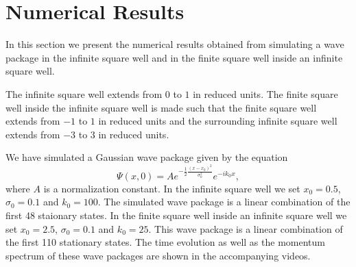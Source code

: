 \documentclass[12pt,a4paper]{article}
\begin{document}
\section{Numerical Results}
In this section we present the numerical results obtained from simulating a wave package in the infinite square well and in the finite square well inside an infinite square well.

The infinite square well extends from $0$ to $1$ in reduced units. The finite square well inside the infinite square well is made such that the finite square well extends from $-1$ to $1$ in reduced units and the surrounding infinite square well extends from $-3$ to $3$ in reduced units.

We have simulated a Gaussian wave package given by the equation
\begin{equation}
\Psi(x, 0) = A e^{- \frac{1}{2} \frac{(x - x_0)^2}{\sigma_0^2}} e^{- i k_0 x},
\end{equation}
where $A$ is a normalization constant. In the infinite square well we set $x_0 = 0.5$, $\sigma_0 = 0.1$ and $k_0 = 100$. The simulated wave package is a linear combination of the first 48 staionary states. In the finite square well inside an infinite square well we set $x_0 = 2.5$, $\sigma_0 = 0.1$ and $k_0 = 25$. This wave package is a linear combination of the first 110 stationary states. The time evolution as well as the momentum spectrum of these wave packages are shown in the accompanying videos.
\end{document}
